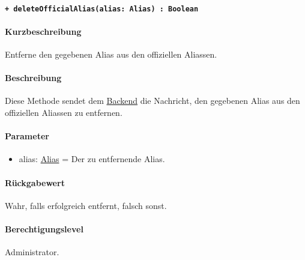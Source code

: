 \paragraph{\texttt{+ deleteOfficialAlias(alias: Alias) : Boolean}}\label{AP_Framework_deleteOfficialAlias}%
\paragraph*{Kurzbeschreibung}
Entferne den gegebenen Alias aus den offiziellen Aliassen.
\paragraph*{Beschreibung}
Diese Methode sendet dem \hyperref[AP_Backend]{Backend} die Nachricht, den gegebenen Alias aus den offiziellen Aliassen zu entfernen.
\paragraph*{Parameter}
\begin{itemize}
    \item alias: \hyperref[AP_Alias]{Alias} = Der zu entfernende Alias.
\end{itemize}
\paragraph*{Rückgabewert}
Wahr, falls erfolgreich entfernt, falsch sonst.
\paragraph*{Berechtigungslevel}
Administrator.